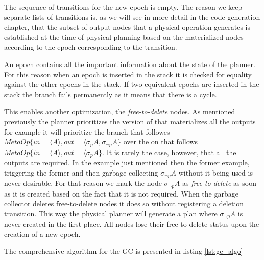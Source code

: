 The sequence of transitions for the new epoch is empty. The reason we
keep separate lists of transitions is, as we will see in more detail
in the code generation chapter, that the subset of output nodes that a
physical operation generates is established at the time of physical
planning based on the materialized nodes according to the epoch
corresponding to the transition.

An epoch contains all the important information about the state of the
planner. For this reason when an epoch is inserted in the stack it is
checked for equality against the other epochs in the stack. If two
equivalent epochs are inserted in the stack the branch fails
permanently as it means that there is a cycle.

This enables another optimization, the \emph{free-to-delete} nodes. As
mentioned previously the planner prioritizes the version of 
that materializes all the outputs for example it will prioritize the
branch that followes \(MetaOp\{in=\langle A \rangle, out=\langle
\sigma_p A, \sigma_{\neg p} A \}\) over the on that follows
\(MetaOp\{in=\langle A \rangle, out=\langle \sigma_p A \}\). It is
rarely the case, however, that all the outputs are required. In the
example just mentioned then the former example, triggering the former
 and then garbage collecting \(\sigma_{\neg p} A\) without it
being used is never desirable. For that reason we mark the node
\(\sigma_{\neg p} A\) as \emph{free-to-delete} as soon as it is created
based on the fact that it is not required. When the garbage collector
deletes free-to-delete nodes it does so without registering a deletion
transition. This way the physical planner will generate a plan where
\(\sigma_{\neg p} A\) is never created in the first place. All nodes
lose their free-to-delete status upon the creation of a new epoch.

The comprehensive algorithm for the GC is presented in listing
\ref{lst:gc_algo}


